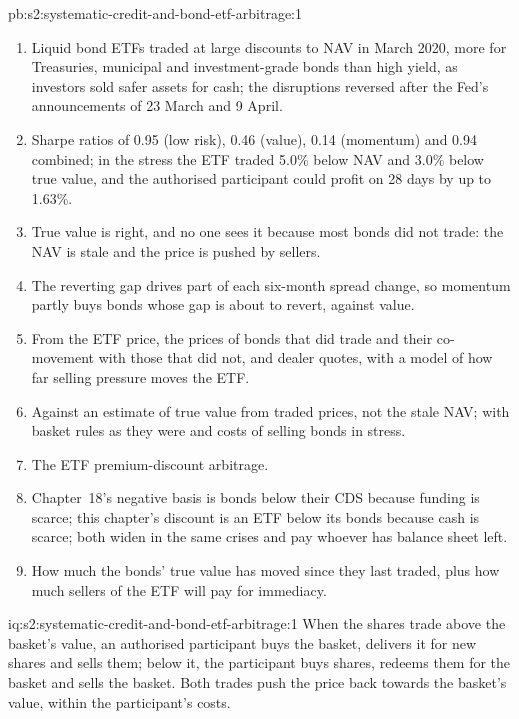 \begin{solution}{pb:s2:systematic-credit-and-bond-etf-arbitrage:1}
\begin{enumerate}
discount averages 2.7 basis points with a standard deviation of 21.6.
\item Liquid bond ETFs traded at large discounts to NAV in March 2020, more for Treasuries, municipal and investment-grade bonds than high yield, as
investors sold safer assets for cash; the disruptions reversed after the Fed's announcements of 23 March and 9 April.
\item Sharpe ratios of 0.95 (low risk), 0.46 (value), 0.14 (momentum) and 0.94 combined; in the stress the ETF traded 5.0\% below NAV and 3.0\% below
true value, and the authorised participant could profit on 28 days by up to 1.63\%.
\item True value is right, and no one sees it because most bonds did not trade: the NAV is stale and the price is pushed by sellers.
\item The reverting gap drives part of each six-month spread change, so momentum partly buys bonds whose gap is about to revert, against value.
\item From the ETF price, the prices of bonds that did trade and their co-movement with those that did not, and dealer quotes, with a model of how
far selling pressure moves the ETF.
\item Against an estimate of true value from traded prices, not the stale NAV; with basket rules as they were and costs of selling bonds in stress.
\item The ETF premium-discount arbitrage.
\item Chapter~18's negative basis is bonds below their CDS because funding is scarce; this chapter's discount is an ETF below its bonds because cash
is scarce; both widen in the same crises and pay whoever has balance sheet left.
\item How much the bonds' true value has moved since they last traded, plus how much sellers of the ETF will pay for immediacy.
\end{enumerate}
\end{solution}

\begin{solution}{iq:s2:systematic-credit-and-bond-etf-arbitrage:1}
When the shares trade above the basket's value, an authorised participant buys the basket, delivers it for new shares and sells them; below it, the
participant buys shares, redeems them for the basket and sells the basket. Both trades push the price back towards the basket's value, within the
participant's costs.
\end{solution}


